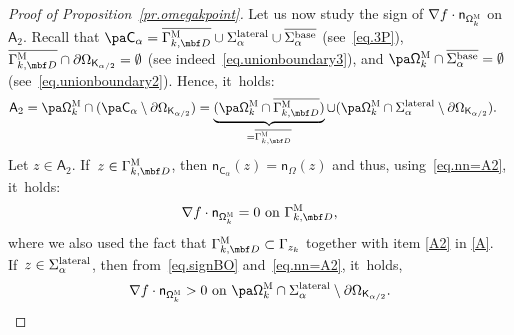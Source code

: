 \begin{proof}[Proof of Proposition~\ref{pr.omegakpoint}]
Let us now study the sign of $\nabla f\cdot \mathsf n_{ \mathsf \Omega_k^{\textsc{M}}}$ on $\mathsf A_2$.
Recall that $\pa \mathsf C_\alpha = \overline{\Gamma_{k,\mbf D}^{\textsc{M}} }\cup { \Sigma_\alpha^{\textup{lateral}} }\cup \overline{ \Sigma_\alpha^{\textup{base}}}$ (see~\eqref{eq.3P}), $\overline{\Gamma_{k,\mbf D}^{\textsc{M}} } \cap \partial \Omega_{\mathsf K_{\alpha/2}} =\emptyset$ (see indeed~\eqref{eq.unionboundary3}), and $\pa \mathsf \Omega_k^{\textsc{M}} \cap \overline{ \Sigma_\alpha^{\textup{base}}}=\emptyset$ (see~\eqref{eq.unionboundary2}). Hence, it~holds:
\begin{align}\label{eq.=A2}
\mathsf A_2=\pa \mathsf \Omega_k^{\textsc{M}}\cap (\pa \mathsf C_\alpha \setminus \partial \Omega_{\mathsf K_{\alpha/2}}) &=\underbrace{(\pa \mathsf \Omega_k^{\textsc{M}} \cap \overline{\Gamma_{k,\mbf D}^{\textsc{M}} })}_{=\overline{\Gamma_{k,\mbf D}^{\textsc{M}} }} \cup (\pa \mathsf \Omega_k^{\textsc{M}} \cap {\Sigma_\alpha^{\textup{lateral}} }\setminus \partial \Omega_{\mathsf K_{\alpha/2}}).
\end{align}
Let $z\in \mathsf A_2$. If~$z\in \Gamma_{k,\mbf D}^{\textsc{M}} $, then $ \mathsf n_{ \mathsf C_\alpha}(z) =\mathsf n_\Omega(z)$ and thus, using~\eqref{eq.nn=A2}, it~holds:
\begin{equation}\label{eq.panf2}
\nabla f\cdot \mathsf n_{ \mathsf \Omega_k^{\textsc{M}}}=0\text{ on } {\Gamma_{k,\mbf D}^{\textsc{M}} },
\end{equation}
where we also used the fact that $\Gamma_{k,\mbf D}^{\textsc{M}} \subset \Gamma_{z_k}$ together with item \eqref{A2} in \ref{A}. If~$z\in \Sigma_\alpha^{\textup{lateral}}$, then from~\eqref{eq.signBO} and~\eqref{eq.nn=A2}, it~holds,
\begin{equation}\label{eq.panf3}
\nabla f\cdot \mathsf n_{ \mathsf \Omega_k^{\textsc{M}}}>0\text{ on }\pa \mathsf \Omega_k^{\textsc{M}} \cap {\Sigma_\alpha^{\textup{lateral}} }\setminus \partial \Omega_{\mathsf K_{\alpha/2}}.
\end{equation}


\end{proof}
